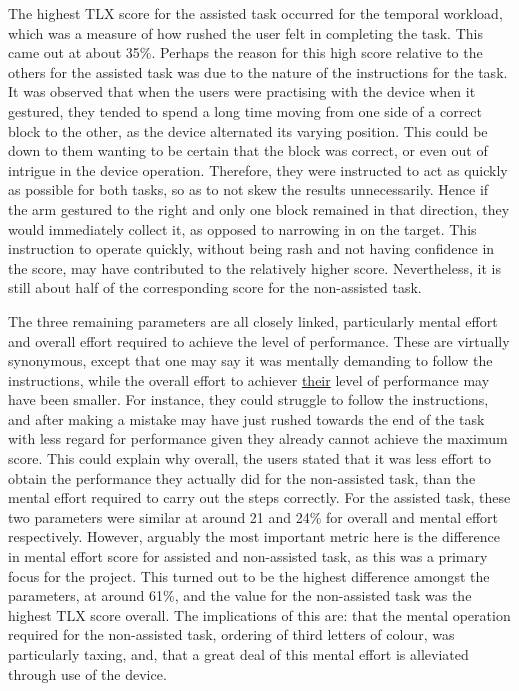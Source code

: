 \documentclass[11pt]{article}
\begin{document}
The highest TLX score for the assisted task occurred for the temporal workload, which was a measure of how rushed the user felt in completing the task. This came out at about 35\%. Perhaps the reason for this high score relative to the others for the assisted task was due to the nature of the instructions for the task. It was observed that when the users were practising with the device when it gestured, they tended to spend a long time moving from one side of a correct block to the other, as the device alternated its varying position. This could be down to them wanting to be certain that the block was correct, or even out of intrigue in the device operation. Therefore, they were instructed to act as quickly as possible for both tasks, so as to not skew the results unnecessarily. Hence if the arm gestured to the right and only one block remained in that direction, they would immediately collect it, as opposed to narrowing in on the target. This instruction to operate quickly, without being rash and not having confidence in the score, may have contributed to the relatively higher score. Nevertheless, it is still about half of the corresponding score for the non-assisted task.

The three remaining parameters are all closely linked, particularly mental effort and overall effort required to achieve the level of performance. These are virtually synonymous, except that one may say it was mentally demanding to follow the instructions, while the overall effort to achiever \underline{their} level of performance may have been smaller. For instance, they could struggle to follow the instructions, and after making a mistake may have just rushed towards the end of the task with less regard for performance given they already cannot achieve the maximum score. This could explain why overall, the users stated that it was less effort to obtain the performance they actually did for the non-assisted task, than the mental effort required to carry out the steps correctly. For the assisted task, these two parameters were similar at around 21 and 24\% for overall and mental effort respectively. However, arguably the most important metric here is the difference in mental effort score for assisted and non-assisted task, as this was a primary focus for the project. This turned out to be the highest difference amongst the parameters, at around 61\%, and the value for the non-assisted task was the highest TLX score overall. The implications of this are: that the mental operation required for the non-assisted task, ordering of third letters of colour, was particularly taxing, and, that a great deal of this mental effort is alleviated through use of the device.
\end{document}
